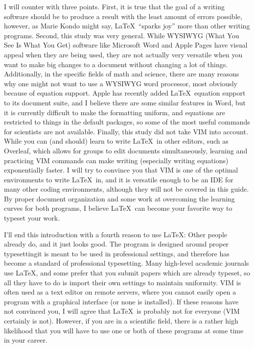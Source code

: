 \documentclass[a4paper, 12pt, twoside]{book}
\begin{document}
I will counter with three points. First, it is true that the goal of a writing software should be to produce a result with the least amount of errors possible, however, as Marie Kondo might say, \LaTeX\ ``sparks joy'' more than other writing programs. Second, this study was very general. While WYSIWYG (What You See Is What You Get) software like Microsoft Word and Apple Pages have visual appeal when they are being used, they are not actually very versatile when you want to make big changes to a document without changing a lot of things. Additionally, in the specific fields of math and science, there are many reasons why one might not want to use a WYSIWYG word processor, most obviously because of equation support. Apple has recently added \LaTeX\ equation support to its document suite, and I believe there are some similar features in Word, but it is currently difficult to make the formatting uniform, and equations are restricted to things in the default packages, so some of the most useful commands for scientists are not available. Finally, this study did not take VIM into account. While you can (and should) learn to write \LaTeX\ in other editors, such as Overleaf, which allows for groups to edit documents simultaneously, learning and practicing VIM commands can make writing (especially writing equations) exponentially faster. I will try to convince you that VIM is one of the optimal environments to write \LaTeX\ in, and it is versatile enough to be an IDE for many other coding environments, although they will not be covered in this guide. By proper document organization and some work at overcoming the learning curves for both programs, I believe \LaTeX\ can become your favorite way to typeset your work.

I'll end this introduction with a fourth reason to use \LaTeX: Other people already do, and it just looks good. The program is designed around proper typesetting\textemdash it is meant to be used in professional settings, and therefore has become a standard of professional typesetting. Many high-level academic journals use \LaTeX, and some prefer that you submit papers which are already typeset, so all they have to do is import their own settings to maintain uniformity. VIM is often used as a text editor on remote servers, where you cannot easily open a program with a graphical interface (or none is installed). If these reasons have not convinced you, I will agree that \LaTeX\ is probably not for everyone (VIM certainly is not). However, if you are in a scientific field, there is a rather high likelihood that you will have to use one or both of these programs at some time in your career.
\end{document}

